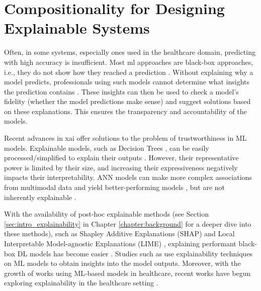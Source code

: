 \section{Compositionality for Designing Explainable Systems}
\label{sec:lit_explainability}

Often, in some systems, especially ones used in the healthcare domain, predicting with high accuracy is insufficient. Most \gls{ml} approaches are black-box approaches, i.e., they do not show how they reached a prediction \cite{molnar_interpretable_nodate}. Without explaining why a model predicts, professionals using such models cannot determine what insights the prediction contains \cite{joyce_explainable_2023}. These insights can then be used to check a model's fidelity (whether the model predictions make sense) \cite{kamath_introduction_2021} and suggest solutions based on these explanations. This ensures the transparency and accountability of the models. 

Recent advances in \gls{xai} offer solutions to the problem of trustworthiness in ML models. Explainable models, such as Decision Trees \cite{molnar_interpretable_nodate}, can be easily processed/simplified to explain their outputs \cite{barredo_arrieta_explainable_2020}. However, their representative power is limited by their size, and increasing their expressiveness negatively impacts their interpretability. ANN models can make more complex associations from multimodal data and yield better-performing models \cite{goodfellow_deep_2016,joyce_explainable_2023}, but are not inherently explainable \cite{molnar_interpretable_nodate}. 

With the availability of post-hoc explainable methods (see Section \ref{sec:intro_explainability} in Chapter \ref{chapter:background} for a deeper dive into these methods), such as Shapley Additive Explanations (SHAP) \cite{lundberg_unified_2017} and Local  Interpretable Model-agnostic Explanations (LIME) \cite{ribeiro_why_2016}, explaining performant black-box DL models has become easier \cite{molnar_interpretable_nodate}. Studies such as \cite{korda_identification_2022, schultebraucks_validated_2020, binder_morphological_2021} use explainability techniques on ML models to obtain insights into the model outputs. Moreover, with the growth of works using ML-based models in healthcare, recent works have begun exploring explainability in the healthcare setting \cite{wang_explainable_2021, zhu_explainable_2023, squires_identifying_2023, zogan_explainable_2022,shah_personalized_2021}. 

